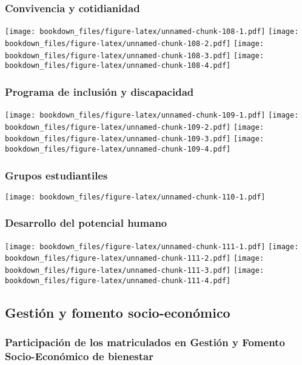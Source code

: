\documentclass[]{article}
\theoremstyle{definition}
\theoremstyle{definition}
\theoremstyle{definition}
\theoremstyle{remark}
\begin{document}
\subsubsection{Convivencia y
cotidianidad}\label{convivencia-y-cotidianidad}

\texttt{[image: bookdown\_files/figure-latex/unnamed-chunk-108-1.pdf]}
\texttt{[image: bookdown\_files/figure-latex/unnamed-chunk-108-2.pdf]}
\texttt{[image: bookdown\_files/figure-latex/unnamed-chunk-108-3.pdf]}
\texttt{[image: bookdown\_files/figure-latex/unnamed-chunk-108-4.pdf]}

\subsubsection{Programa de inclusión y
discapacidad}\label{programa-de-inclusion-y-discapacidad}

\texttt{[image: bookdown\_files/figure-latex/unnamed-chunk-109-1.pdf]}
\texttt{[image: bookdown\_files/figure-latex/unnamed-chunk-109-2.pdf]}
\texttt{[image: bookdown\_files/figure-latex/unnamed-chunk-109-3.pdf]}
\texttt{[image: bookdown\_files/figure-latex/unnamed-chunk-109-4.pdf]}

\subsubsection{Grupos estudiantiles}\label{grupos-estudiantiles}

\texttt{[image: bookdown\_files/figure-latex/unnamed-chunk-110-1.pdf]}

\subsubsection{Desarrollo del potencial
humano}\label{desarrollo-del-potencial-humano}

\texttt{[image: bookdown\_files/figure-latex/unnamed-chunk-111-1.pdf]}
\texttt{[image: bookdown\_files/figure-latex/unnamed-chunk-111-2.pdf]}
\texttt{[image: bookdown\_files/figure-latex/unnamed-chunk-111-3.pdf]}
\texttt{[image: bookdown\_files/figure-latex/unnamed-chunk-111-4.pdf]}

\subsection{Gestión y fomento
socio-económico}\label{gestion-y-fomento-socio-economico}

\subsubsection{Participación de los matriculados en Gestión y Fomento
Socio-Económico de
bienestar}\label{participacion-de-los-matriculados-en-gestion-y-fomento-socio-economico-de-bienestar}
\end{document}
